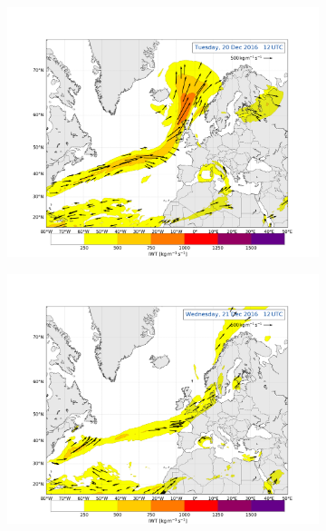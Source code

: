\begin{figure}[H]
	\centering
	\begin{subfigure}[b]{0.49\textwidth}
		\includegraphics[trim={4.2cm 3.9cm 4.3cm 5.1cm},clip,
		width=\textwidth]{./fig_Atm_Riv/20161220_12}
		\caption{}\label{fig:AR20}
	\end{subfigure}
	\begin{subfigure}[b]{0.49\textwidth}
		\includegraphics[trim={4.2cm 3.9cm 4.3cm 5.1cm},clip,
		width=\textwidth]{./fig_Atm_Riv/20161221_12}
		\caption{}\label{fig:AR21}
	\end{subfigure}

\end{figure}

